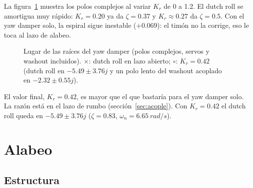 \documentclass[11pt,a4paper]{article}
\begin{document}
La figura~\ref{fig:lugar} muestra los polos complejos al variar $K_r$ de 0 a
1.2. El dutch roll se amortigua muy rápido: $K_r = 0.20$ ya da $\zeta = 0.37$ y
$K_r \approx 0.27$ da $\zeta = 0.5$. Con el yaw damper solo, la espiral sigue
inestable ($+0.069$): el timón no la corrige, eso le toca al lazo de alabeo.

\begin{figure}[htbp]
\centering
{}
\caption{Lugar de las raíces del yaw damper (polos complejos, servos y washout
incluidos). $\times$: dutch roll en lazo abierto; $\circ$: $K_r = 0.42$
(dutch roll en $-5.49 \pm 3.76j$ y un polo lento del washout acoplado en
$-2.32 \pm 0.55j$).}
\label{fig:lugar}
\end{figure}

El valor final, $K_r = 0.42$, es mayor que el que bastaría para el yaw damper
solo. La razón está en el lazo de rumbo (sección~\ref{sec:acople}). Con
$K_r = 0.42$ el dutch roll queda en $-5.49 \pm 3.76j$ ($\zeta = 0.83$,
$\omega_n = \SI{6.65}{rad/s}$).

\section{Alabeo}
\label{sec:alabeo}

\subsection{Estructura}
\end{document}
